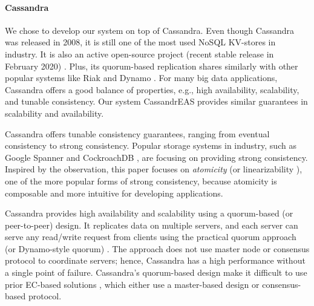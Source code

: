 \paragraph*{Cassandra}

We chose to develop our system on top of Cassandra. Even though Cassandra was released in 2008, it is still one of the most used NoSQL KV-stores in industry. It is also an active open-source project (recent stable release in February 2020) \cite{DBEnginesCassandra}. Plus, its quorum-based replication \cite{pbs-vldb2012} shares similarly with other popular systems like Riak \cite{Riak} and Dynamo \cite{Dynamo}. For many big data applications, Cassandra offers a good balance of properties, e.g., high availability, scalability, and tunable consistency. Our system CassandrEAS provides similar guarantees in scalability and availability.%


Cassandra offers tunable consistency guarantees, ranging from eventual consistency to strong consistency.
Popular storage systems in industry, such as Google Spanner \cite{Spanner} and CockroachDB \cite{cockroachDB}, are focusing on providing strong consistency. 
Inspired by the observation, this paper focuses on \textit{atomicity} \cite{lamport} (or linearizability \cite{herlihy1990linearizability}), one of the more popular forms of strong consistency, because atomicity is composable \cite{herlihy1990linearizability} and more intuitive for developing applications.


Cassandra provides high availability and scalability using a quorum-based (or peer-to-peer) design.
It replicates data on multiple servers, and each server can serve any read/write request from clients 
using the practical quorum approach (or Dynamo-style quorum) \cite{pbs-vldb2012}. 
The approach does not use master node or consensus protocol to coordinate servers; hence, Cassandra has a high performance without a single point of failure. 
Cassandra's quorum-based design make it difficult to use prior EC-based solutions \cite{Cocytus2016,GIZA2017}, which either use a master-based design or consensus-based protocol.

